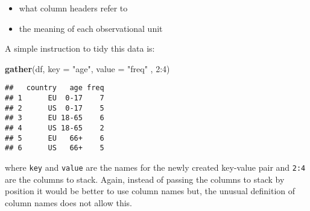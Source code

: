 \documentclass[]{book}
\newenvironment{Shaded}{\begin{snugshade}}{\end{snugshade}}
\newcommand{\KeywordTok}[1]{\textcolor[rgb]{0.13,0.29,0.53}{\textbf{{#1}}}}
\newcommand{\DataTypeTok}[1]{\textcolor[rgb]{0.13,0.29,0.53}{{#1}}}
\newcommand{\DecValTok}[1]{\textcolor[rgb]{0.00,0.00,0.81}{{#1}}}
\newcommand{\StringTok}[1]{\textcolor[rgb]{0.31,0.60,0.02}{{#1}}}
\newcommand{\NormalTok}[1]{{#1}}
\providecommand{\tightlist}{%
  \setlength{\itemsep}{0pt}\setlength{\parskip}{0pt}}
\def\tightlist{}
\begin{document}
\begin{itemize}
\tightlist
\item
  what column headers refer to
\item
  the meaning of each observational unit
\end{itemize}

A simple instruction to tidy this data is:

\begin{Shaded}
\begin{Highlighting}[]
\KeywordTok{gather}\NormalTok{(df, }\DataTypeTok{key =} \StringTok{"age"}\NormalTok{, }\DataTypeTok{value =} \StringTok{"freq"} \NormalTok{, }\DecValTok{2}\NormalTok{:}\DecValTok{4}\NormalTok{)}
\end{Highlighting}
\end{Shaded}

\begin{verbatim}
##   country   age freq
## 1      EU  0-17    7
## 2      US  0-17    5
## 3      EU 18-65    6
## 4      US 18-65    2
## 5      EU   66+    6
## 6      US   66+    5
\end{verbatim}

where \texttt{key} and \texttt{value} are the names for the newly
created key-value pair and \texttt{2:4} are the columns to stack. Again,
instead of passing the columns to stack by position it would be better
to use column names but, the unusual definition of column names does not
allow this.

\begin{Shaded}
\end{Shaded}
\end{document}
